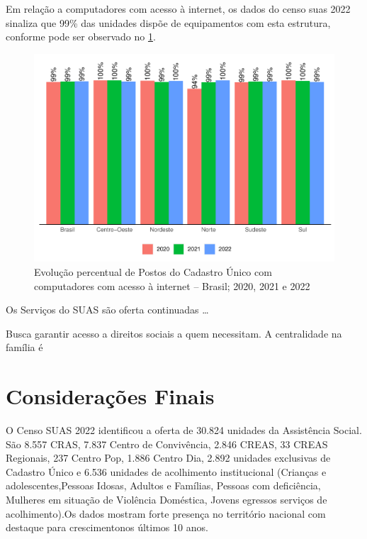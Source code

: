 \documentclass[
  brazilian]{report}
\begin{document}
Em relação a computadores com acesso à internet, os dados do censo suas
2022 sinaliza que 99\% das unidades dispõe de equipamentos com esta
estrutura, conforme pode ser observado no
\cref{fig:postcad-internet-percentual}.

\begin{figure}
\includegraphics{Censo-SUAS-2022_files/figure-latex/postcad-internet-percentual-1} \caption[Evolução percentual de Postos do Cadastro Único com computadores com acesso à internet – Brasil]{Evolução percentual de Postos do Cadastro Único com computadores com acesso à internet – Brasil;  2020, 2021 e 2022}\label{fig:postcad-internet-percentual}
\end{figure}

Os Serviços do SUAS são oferta continuadas \ldots{}

Busca garantir acesso a direitos sociais a quem necessitam. A
centralidade na família é 

\hypertarget{considerauxe7uxf5es-finais-1}{%
\section{Considerações Finais}\label{considerauxe7uxf5es-finais-1}}

O Censo SUAS 2022 identificou a oferta de 30.824 unidades da Assistência
Social. São 8.557 CRAS, 7.837 Centro de Convivência, 2.846 CREAS, 33
CREAS Regionais, 237 Centro Pop, 1.886 Centro Dia, 2.892 unidades
exclusivas de Cadastro Único e 6.536 unidades de acolhimento
institucional (Crianças e adolescentes,Pessoas Idosas, Adultos e
Famílias, Pessoas com deficiência, Mulheres em situação de Violência
Doméstica, Jovens egressos serviços de acolhimento).Os dados mostram
forte presença no território nacional com destaque para crescimentonos
últimos 10 anos.
\end{document}
